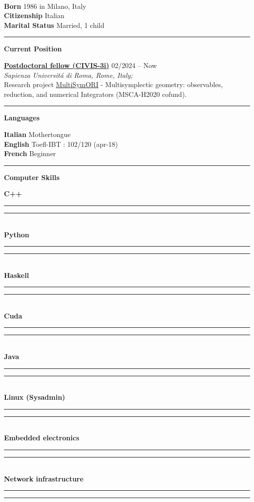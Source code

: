 \documentclass[a4paper]{article}
\newcommand{\crule}[3][black]{\textcolor{#1}{\rule{#2}{#3}}}
\newcommand{\progbar}[4][black]{\crule[#1]{#3}{#4}\crule[#1!10!white!90]{#2}{#4}}
\newcommand{\block}[1]{\hrule \vspace{0.2cm} \textbf{\Large #1} \vspace{0.2cm}}
\newcommand{\voice}[5]{\href{#4}{\textbf{#1}} \hfill #2 \\ \textit{#3} \\ {\small #5} \vspace{0.2cm} \\}
\newcommand{\skill}[2]{\textbf{#1} \hfill #2 \\}
\newcommand{\skillbar}[4]{\textbf{#1} \hfill \progbar{#2}{#3}{#4} \\}
\begin{document}
	\vfill

	\tableofcontents
	
	\vfill

	\clearpage

	\begin{minipage}[c]{0.6\columnwidth}
		\\
	\end{minipage} 
	\hfill
	\begin{minipage}[t]{0.37\columnwidth}
		\skill{Born}{1986 in Milano, Italy }
		\skill{Citizenship}{Italian }
		\skill{Marital Status}{Married, 1 child }
	\end{minipage}
	\vspace{-0.25em}

	\begin{minipage}[t]{0.6\columnwidth}

		\block{Current Position}

		\voice{Postdoctoral fellow (CIVIS-3i)}
			{02/2024 -- Now}
			{Sapienza Universit\'a di Roma, Rome, Italy;}
			{https://civis3i.univ-amu.fr/en/civis3i-alliance-programme}       
			{Research project \href{https://civis3i.univ-amu.fr/en/antonio-michele-miti}{MultiSymORI} - Multisymplectic geometry: observables, reduction, and numerical Integrators (MSCA-H2020 cofund).\vspace{-0.25cm}}


	\end{minipage} 
	\hfill
	\begin{minipage}[t]{0.375\columnwidth}


		\block{Languages} 
		
		\skill{Italian}{Mothertongue}
		\skill{English}{Toefl-IBT : 102/120 (apr-18)}
		\skill{French}{Beginner}


		\block{Computer Skills} 
		
		\skillbar{C++}
			{1.4cm}
			{0.6cm}
			{0.25cm}
		\skillbar{Python}
			{1.1cm}
			{0.9cm}
			{0.25cm}
		\skillbar{Haskell}
			{1.5cm}
			{0.5cm}
			{0.25cm}
		\skillbar{Cuda}
			{1.1cm}
			{0.9cm}
			{0.25cm}
		\skillbar{Java}
			{1.2cm}
			{0.8cm}
			{0.25cm}
		\skillbar{Linux (Sysadmin)}
			{0.7cm}
			{1.3cm}
			{0.25cm}
		\skillbar{Embedded electronics}
			{1.5cm}
			{0.5cm}
			{0.25cm}
		\skillbar{Network infrastructure}
			{1.6cm}
			{0.4cm}
			{0.25cm}
	\end{minipage}
\end{document}
